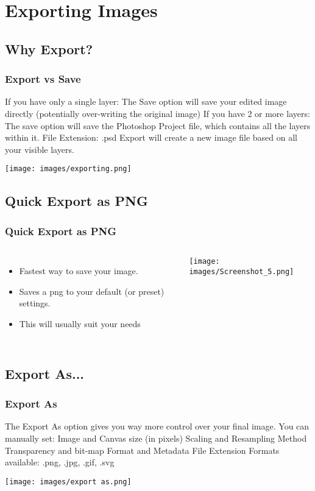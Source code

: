 \documentclass{beamer}
\begin{document}
	\section{Exporting Images}	
	
	\subsection{Why Export?}
	\begin{frame}
		\frametitle{Export vs Save}
		\begin{outline}
			\1 If you have only a single layer:
			\2 The Save option will save your edited image directly (potentially over-writing the original image)
			\1 If you have 2 or more layers:
			\2 The save option will save the Photoshop Project file, which contains all the layers within it.
			\3 File Extension:  .psd
			\1 Export will create a new image file based on all your visible layers.
		\end{outline}
		\begin{center}
			\texttt{[image: images/exporting.png]}
		\end{center}
	\end{frame}

\subsection{Quick Export as PNG}
\begin{frame}
	\frametitle{Quick Export as PNG}	
	\begin{columns}
		\column{.6\textwidth}
		\vspace{-75pt}
		\begin{itemize}
			\item Fastest way to save your image.
			\item Saves a png to your default (or preset) settings.  
			\item This will usually suit your needs
		\end{itemize}
		\column{.45\textwidth}
		\texttt{[image: images/Screenshot\_5.png]}
	\end{columns}
\end{frame}

\subsection{Export As...}
\begin{frame}
	\frametitle{Export As}
	\begin{outline}
		\1 The Export As option gives you way more control over your final image.
		\1 You can manually set:
		\2 Image and Canvas size (in pixels)
		\2 Scaling and Resampling Method
		\2 Transparency and bit-map
		\2 Format and Metadata
		\1 File Extension Formats available:
		\2 .png, .jpg, .gif, .svg
	\end{outline}
	\begin{center}
		\texttt{[image: images/export as.png]}
	\end{center}
\end{frame}
\end{document}
